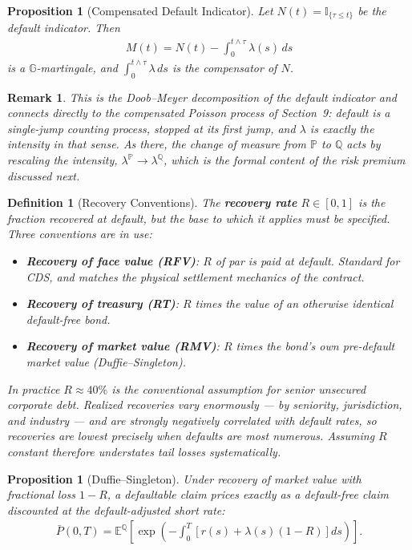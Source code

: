 \documentclass{report}
\theoremstyle{spacedplain}
\newtheorem{proposition}[theorem]{Proposition}
\theoremstyle{spaceddefinition}
\newtheorem{definition}[theorem]{Definition}
\theoremstyle{spacedremark}
\newtheorem{remark}[theorem]{Remark}
\begin{document}
\begin{proposition}[Compensated Default Indicator]
    Let $N(t) = \mathbb{I}_{\{\tau\leq t\}}$ be the default indicator. Then
    \begin{align}
        M(t) = N(t) - \int_0^{t\wedge\tau}\lambda(s)\,ds
    \end{align}
    is a $\mathbb{G}$-martingale, and $\int_0^{t\wedge\tau}\lambda\,ds$ is the compensator of $N$.
\end{proposition}

\begin{remark}
    This is the Doob--Meyer decomposition of the default indicator and connects directly to the compensated Poisson process of Section~9: default is a single-jump counting process, stopped at its first jump, and $\lambda$ is exactly the intensity in that sense. As there, the change of measure from $\mathbb{P}$ to $\mathbb{Q}$ acts by rescaling the intensity, $\lambda^{\mathbb{P}} \to \lambda^{\mathbb{Q}}$, which is the formal content of the risk premium discussed next.
\end{remark}

\begin{definition}[Recovery Conventions]
    The \textbf{recovery rate} $R\in[0,1]$ is the fraction recovered at default, but the base to which it applies must be specified. Three conventions are in use:
    \begin{itemize}[noitemsep]
        \item \textbf{Recovery of face value (RFV)}: $R$ of par is paid at default. Standard for CDS, and matches the physical settlement mechanics of the contract.
        \item \textbf{Recovery of treasury (RT)}: $R$ times the value of an otherwise identical default-free bond.
        \item \textbf{Recovery of market value (RMV)}: $R$ times the bond's own pre-default market value (Duffie--Singleton).
    \end{itemize}
    In practice $R \approx 40\%$ is the conventional assumption for senior unsecured corporate debt. Realized recoveries vary enormously --- by seniority, jurisdiction, and industry --- and are strongly \emph{negatively} correlated with default rates, so recoveries are lowest precisely when defaults are most numerous. Assuming $R$ constant therefore understates tail losses systematically.
\end{definition}

\begin{proposition}[Duffie--Singleton]
    Under recovery of market value with fractional loss $1-R$, a defaultable claim prices exactly as a default-free claim discounted at the \emph{default-adjusted} short rate:
    \begin{align}
        \bar{P}(0,T) = \mathbb{E}^{\mathbb{Q}}\!\left[\exp\!\left(-\int_0^T \left[r(s) + \lambda(s)(1-R)\right] ds\right)\right].
    \end{align}
\end{proposition}
\end{document}
